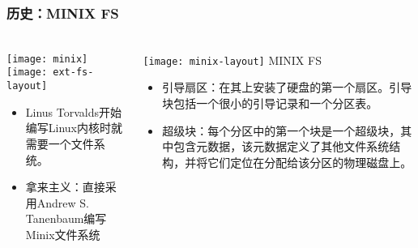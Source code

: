 \begin{frame}[fragile]
	\frametitle{历史：MINIX FS}
	
	\frametitle{ }
	\begin{columns}[t]
		\begin{column}{.4\textwidth}
			\texttt{[image: minix]}
			\texttt{[image: ext-fs-layout]}
	
			\begin{itemize}
				\item Linus Torvalds开始编写Linux内核时就需要一个文件系统。
				\item 拿来主义：直接采用Andrew S. Tanenbaum编写Minix文件系统
			\end{itemize}
		
		\end{column} \pause
		
		\begin{column}{.6\textwidth}			
			\texttt{[image: minix-layout]}
			MINIX FS
				\begin{itemize}
					\item 引导扇区：在其上安装了硬盘的第一个扇区。引导块包括一个很小的引导记录和一个分区表。
					\item 超级块：每个分区中的第一个块是一个超级块，其中包含元数据，该元数据定义了其他文件系统结构，并将它们定位在分配给该分区的物理磁盘上。
				\end{itemize}
			
		\end{column}
	\end{columns}
	
\end{frame}

